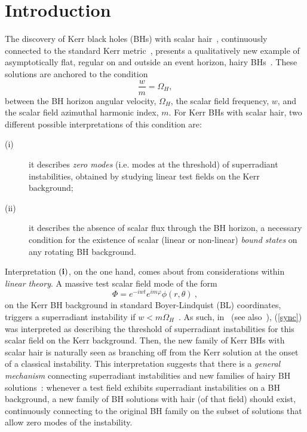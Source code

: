 \section{Introduction}
The discovery of Kerr black holes (BHs) with scalar hair~\cite{Herdeiro:2014goa}, continuously connected to the standard Kerr metric~\cite{Kerr:1963ud}, presents a qualitatively new example of asymptotically flat, regular on and outside an event horizon, hairy BHs~\cite{Herdeiro:2014ima,Herdeiro:2014jaa}. These solutions are anchored to the condition
\begin{equation}
\frac{w}{m}=\Omega_H , 
\label{sync}
\end{equation}
between the BH horizon angular velocity, $\Omega_H$, the scalar field frequency, $w$, and the scalar field azimuthal harmonic index, $m$. For Kerr BHs with scalar hair, two different possible interpretations of this condition are: 
\begin{description}
\item[(i)] it describes \textit{zero modes} (i.e. modes at the threshold) of superradiant instabilities, obtained by studying linear test fields on the Kerr background;
\item[(ii)] it describes the absence of scalar flux through the BH horizon, a necessary condition for the existence of scalar  (linear or non-linear)  \textit{bound states} on any rotating BH background.
\end{description}
%
%
%

Interpretation ${\bf (i)}$, on the one hand, comes about from considerations within \textit{linear theory}. A massive test scalar field mode of the form 
\begin{equation}
\Phi= e^{-iwt}e^{im\varphi}\phi(r,\theta) \ , 
\label{scalar-ansatz}
\end{equation}
on the Kerr BH background in standard Boyer-Lindquist (BL) coordinates, triggers a superradiant instability if $w<m\Omega_H$~\cite{Press:1972zz}. As such,  in~\cite{Herdeiro:2014goa} (see also~\cite{Dias:2011at}),  (\ref{sync}) was interpreted as describing the threshold of superradiant instabilities for this scalar field on the Kerr background. Then, the new family of Kerr BHs with scalar hair is naturally seen as branching off from the Kerr solution at the onset of a classical instability. This interpretation suggests that there is a \textit{general mechanism} connecting superradiant instabilities and new families of hairy BH solutions~\cite{Herdeiro:2014goa,Herdeiro:2014ima}: whenever a test field exhibits superradiant instabilities on a BH background, a new family of BH solutions with hair (of that field) should exist, continuously connecting to the original BH family on the subset of solutions that allow zero modes of the instability.

